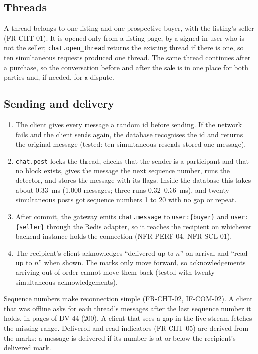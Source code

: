 \documentclass[11pt,a4paper]{article}
\begin{document}
\subsection{Threads}
A thread belongs to one listing and one prospective buyer, with the listing's seller (FR-CHT-01). It is opened only from a listing page, by a signed-in user who is not the seller; \texttt{chat.open\_thread} returns the existing thread if there is one, so ten simultaneous requests produced one thread. The same thread continues after a purchase, so the conversation before and after the sale is in one place for both parties and, if needed, for a dispute.

\subsection{Sending and delivery}
\begin{enumerate}[nosep]
  \item The client gives every message a random id before sending. If the network fails and the client sends again, the database recognises the id and returns the original message (tested: ten simultaneous resends stored one message).
  \item \texttt{chat.post} locks the thread, checks that the sender is a participant and that no block exists, gives the message the next sequence number, runs the detector, and stores the message with its flags. Inside the database this takes about 0.33~ms (1{,}000 messages; three runs 0.32--0.36~ms), and twenty simultaneous posts got sequence numbers 1 to 20 with no gap or repeat.
  \item After commit, the gateway emits \texttt{chat.message} to \texttt{user:\{buyer\}} and \texttt{user:\{seller\}} through the Redis adapter, so it reaches the recipient on whichever backend instance holds the connection (NFR-PERF-04, NFR-SCL-01).
  \item The recipient's client acknowledges ``delivered up to $n$'' on arrival and ``read up to $n$'' when shown. The marks only move forward, so acknowledgements arriving out of order cannot move them back (tested with twenty simultaneous acknowledgements).
\end{enumerate}
Sequence numbers make reconnection simple (FR-CHT-02, IF-COM-02). A client that was offline asks for each thread's messages after the last sequence number it holds, in pages of DV-44 (200). A client that sees a gap in the live stream fetches the missing range. Delivered and read indicators (FR-CHT-05) are derived from the marks: a message is delivered if its number is at or below the recipient's delivered mark.
\end{document}
